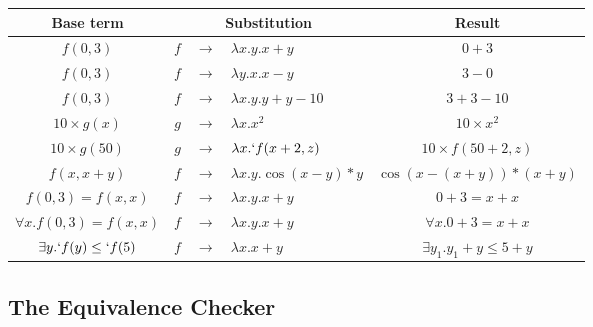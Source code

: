 \begin{example} \phantom{ }
  \begin{center}
    \begin{tabular}{|c|r c l|c|}
      \noalign{\vspace{0.5em}}
      \hline
      Base term            & \multicolumn{3}{c|}{Substitution} & Result                                                                 \\
      \hline
      $f(0, 3)$           & $f$                              & $\rightarrow$ & $\lambda x.y. x+y$         & $0+3$                     \\
      $f(0, 3)$           & $f$                              & $\rightarrow$ & $\lambda y.x. x-y$         & $3-0$                     \\
      $f(0, 3)$           & $f$                              & $\rightarrow$ & $\lambda x.y. y+y-10$      & $3+3-10$                  \\
      $10 \times {g(x)}$  & $g$                              & $\rightarrow$ & $\lambda x. x^2$           & $10 \times x^2$           \\
      $10 \times {g(50)}$ & $g$                              & $\rightarrow$ & $\lambda x. `f(x+2, z)$    & $10 \times {f(50+2, z)}$ \\
      $f(x, x+y)$         & $f$                              & $\rightarrow$ & $\lambda x.y. \cos(x-y)*y$ & $\cos(x-(x+y))*(x+y)$     \\
      $f(0, 3) = f(x, x)$            & $f$                              & $\rightarrow$ & $\lambda x.y. x+y$ & $0+3 = x+x$                   \\
      $\forall x. f(0, 3) = f(x, x)$ & $f$                              & $\rightarrow$ & $\lambda x.y. x+y$ & $\forall x. 0+3 = x+x$        \\

      $\exists y. `f(y) \leq `f(5)$    & $f$                              & $\rightarrow$ & $\lambda x. x+y$   & $\exists y_1. y_1+y \leq 5+y$ \\

      \hline
    \end{tabular}
  \end{center}
\end{example}

\subsection{The Equivalence Checker}
\label{subsec:equivalencechecker}

